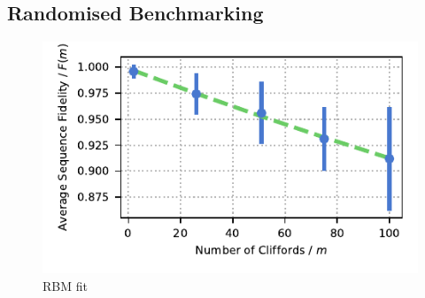 \documentclass[12pt]{report}
\begin{document}
\subsection{Randomised Benchmarking}
\label{sec:Randomised Benchmarking}

    \begin{figure}
        \begin{center}
        \noindent\includegraphics[width=\linewidth]{
            figures/pdf_figure/rbm_fit.pdf
            }
        \end{center}
        \caption{
            RBM fit
            }
        \label{fig:rbm}
    \end{figure}
\end{document}
